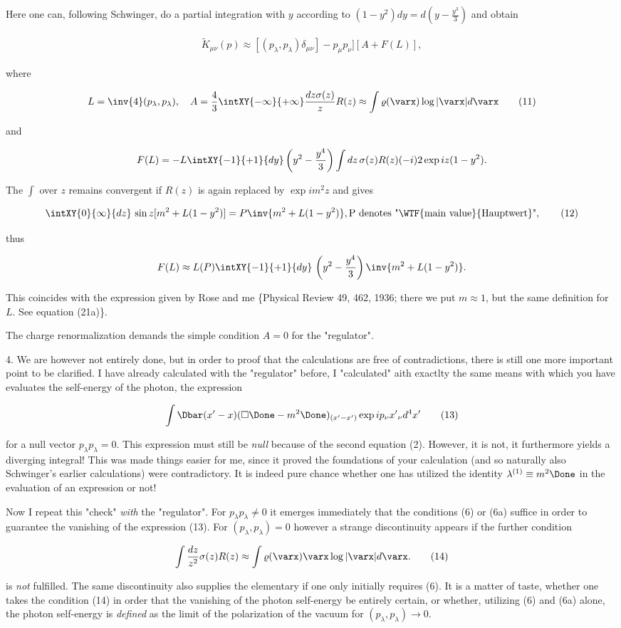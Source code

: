 \documentclass{article}
\newcommand{\nequ}[2]{
\begin{align*}
#1
\tag{#2}
\end{align*}
}
\newcommand{\uequ}[1]{
\begin{align*}
#1
\end{align*}
}
\begin{document}
Here one can, following Schwinger, do a partial integration with $y$ according to $(1-y^2){dy} = {d\left(y-\frac{y^3}{3}\right)}$ and obtain
\nequ{
\widetilde{K}_{\mu\nu}(p) \approx [(p_\lambda,p_\lambda)\delta_{\mu\nu}] - p_\mu p_\nu][A + F(L)],
}{10}
where
\nequ{
L=\inv{4}(p_\lambda, p_\lambda),\quad
A=\frac{4}{3}\intXY{-\infty}{+\infty}\frac{{dz}\sigma(z)}{z}R(z)
\approx \int\varrho(\varx)\log{|\varx|}{d\varx}
}{11}
and
\uequ{
F(L) = -L\intXY{-1}{+1}{dy}\left(y^2 - \frac{y^4}{3}\right)
\int {dz}\,\sigma(z)R(z)(-i)2\exp{iz(1-y^2)}.
}

The $\int$ over $z$ remains convergent if $R(z)$ is again replaced by $\exp{im^2 z}$ and gives
\nequ{
\intXY{0}{\infty}{dz}\,\sin{z}[m^2 + L(1-y^2)] =
P\inv{m^2 + L(1-y^2)}, \text{P denotes "\WTF{main value}{Hauptwert}"},
}{12}
thus
\uequ{
F(L) \approx L(P) \intXY{-1}{+1}{dy}\,\left(y^2 - \frac{y^4}{3}\right)\inv{m^2 + L(1-y^2)}.
}

This coincides with the expression given by Rose and me \{Physical Review 49, 462, 1936; there we put $m \approx 1$, but the same definition for $L$. See equation (21a)\}.

The charge renormalization demands the simple condition $A=0$ for the "regulator".

4. We are however not entirely done, but in order to proof that the calculations are free of contradictions, there is still one more important point to be clarified. I have already calculated with the "regulator" before, I "calculated" aith exactlty the same means with which you have evaluates the self-energy of the photon, the expression
\nequ{
\int\Dbar(x'-x)(\square\Done - m^2 \Done)_{(x'-x')}\exp{ip_\nu {x'}_\nu}{d^4 x'}
}{13}
for a null vector $p_\lambda p_\lambda = 0$. This expression must still be \textit{null} because of the second equation (2). However, it is not, it furthermore yields a diverging integral! This was made things easier for me, since it proved the foundations of your calculation (and so naturally also Schwinger's earlier calculations) were contradictory. It is indeed pure chance whether one has utilized the identity $\lambda^{(1)} \equiv m^2 \Done$ in the evaluation of an expression or not!

Now I repeat this "check" \textit{with} the "regulator". For $p_\lambda p_\lambda \neq 0$ it emerges immediately that the conditions (6) or (6a) suffice in order to guarantee the vanishing of the expression (13). For $(p_\lambda,p_\lambda) = 0$ however a strange discontinuity appears if the further condition
\nequ{
\int\frac{{dz}}{z^2}\sigma(z)R(z) \approx 
\int\varrho(\varx)\varx\log{|\varx|}{d\varx}.
}{14}
is \textit{not} fulfilled. The same discontinuity also supplies the elementary  if one only initially requires (6). It is a matter of taste, whether one takes the condition (14) in order that the vanishing of the photon self-energy be entirely certain, or whether, utilizing (6) and (6a) alone, the photon self-energy is \textit{defined} as the limit of the polarization of the vacuum for $(p_\lambda, p_\lambda) \to 0$.
\end{document}
